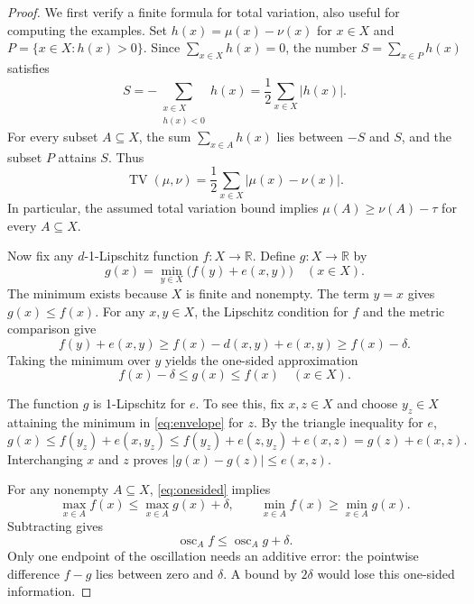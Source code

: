 \documentclass[a4paper,11pt]{article}
\DeclareMathOperator{\osc}{osc}
\DeclareMathOperator{\TV}{TV}
\begin{document}
\begin{proof}
We first verify a finite formula for total variation, also useful for
computing the examples. Set $h(x)=\mu(x)-\nu(x)$ for $x\in X$ and
$P=\{x\in X:h(x)>0\}$. Since $\sum_{x\in X}h(x)=0$, the number
$S=\sum_{x\in P}h(x)$ satisfies
\[
 S=-\sum_{\substack{x\in X\\h(x)<0}}h(x)
   =\frac12\sum_{x\in X}|h(x)|.
\]
For every subset $A\subseteq X$, the sum $\sum_{x\in A}h(x)$ lies
between $-S$ and $S$, and the subset $P$ attains $S$. Thus
\begin{equation}\label{eq:tvsum}
 \TV(\mu,\nu)=\frac12\sum_{x\in X}|\mu(x)-\nu(x)|.
\end{equation}
In particular, the assumed total variation bound implies
$\mu(A)\ge\nu(A)-\tau$ for every $A\subseteq X$.

Now fix any $d$-1-Lipschitz function $f:X\to\mathbb R$. Define
$g:X\to\mathbb R$ by
\begin{equation}\label{eq:envelope}
 g(x)=\min_{y\in X}\bigl(f(y)+e(x,y)\bigr)\quad(x\in X).
\end{equation}
The minimum exists because $X$ is finite and nonempty. The term $y=x$
gives $g(x)\le f(x)$. For any $x,y\in X$, the Lipschitz condition for
$f$ and the metric comparison give
\[
 f(y)+e(x,y)
 \ge f(x)-d(x,y)+e(x,y)
 \ge f(x)-\delta.
\]
Taking the minimum over $y$ yields the one-sided approximation
\begin{equation}\label{eq:onesided}
 f(x)-\delta\le g(x)\le f(x)\quad(x\in X).
\end{equation}

The function $g$ is 1-Lipschitz for $e$. To see this, fix $x,z\in X$
and choose $y_z\in X$ attaining the minimum in \eqref{eq:envelope}
for $z$. By the triangle inequality for $e$,
\[
 g(x)\le f(y_z)+e(x,y_z)
       \le f(y_z)+e(z,y_z)+e(x,z)
       =g(z)+e(x,z).
\]
Interchanging $x$ and $z$ proves
$|g(x)-g(z)|\le e(x,z)$.

For any nonempty $A\subseteq X$, \eqref{eq:onesided} implies
\[
 \max_{x\in A}f(x)\le\max_{x\in A}g(x)+\delta,
 \qquad
 \min_{x\in A}f(x)\ge\min_{x\in A}g(x).
\]
Subtracting gives
\begin{equation}\label{eq:oscillation}
 \osc_A f\le\osc_A g+\delta.
\end{equation}
Only one endpoint of the oscillation needs an additive error: the
pointwise difference $f-g$ lies between zero and $\delta$. A bound by
$2\delta$ would lose this one-sided information.


\end{proof}
\end{document}
